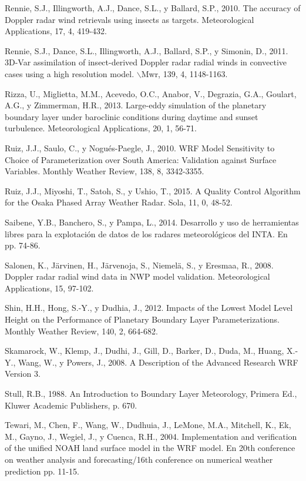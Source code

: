 \documentclass[12pt,spanish,oneside]{book}
\begin{document}
\hypertarget{ref-Rennie2010}{}
Rennie, S.J., Illingworth, A.J., Dance, S.L., y Ballard, S.P., 2010. The
accuracy of Doppler radar wind retrievals using insects as targets.
Meteorological Applications, 17, 4, 419-432.

\hypertarget{ref-Rennie2011}{}
Rennie, S.J., Dance, S.L., Illingworth, A.J., Ballard, S.P., y Simonin,
D., 2011. 3D-Var assimilation of insect-derived Doppler radar radial
winds in convective cases using a high resolution model.
\(\backslash\)Mwr, 139, 4, 1148-1163.

\hypertarget{ref-Rizza2013}{}
Rizza, U., Miglietta, M.M., Acevedo, O.C., Anabor, V., Degrazia, G.A.,
Goulart, A.G., y Zimmerman, H.R., 2013. Large-eddy simulation of the
planetary boundary layer under baroclinic conditions during daytime and
sunset turbulence. Meteorological Applications, 20, 1, 56-71.

\hypertarget{ref-Ruiz2010}{}
Ruiz, J.J., Saulo, C., y Nogués-Paegle, J., 2010. WRF Model Sensitivity
to Choice of Parameterization over South America: Validation against
Surface Variables. Monthly Weather Review, 138, 8, 3342-3355.

\hypertarget{ref-Ruiz2015}{}
Ruiz, J.J., Miyoshi, T., Satoh, S., y Ushio, T., 2015. A Quality Control
Algorithm for the Osaka Phased Array Weather Radar. Sola, 11, 0, 48-52.

\hypertarget{ref-Saibene2014}{}
Saibene, Y.B., Banchero, S., y Pampa, L., 2014. Desarrollo y uso de
herramientas libres para la explotación de datos de los radares
meteorológicos del INTA. En pp. 74-86.

\hypertarget{ref-Salonen2008}{}
Salonen, K., Järvinen, H., Järvenoja, S., Niemelä, S., y Eresmaa, R.,
2008. Doppler radar radial wind data in NWP model validation.
Meteorological Applications, 15, 97-102.

\hypertarget{ref-Shin2012}{}
Shin, H.H., Hong, S.-Y., y Dudhia, J., 2012. Impacts of the Lowest Model
Level Height on the Performance of Planetary Boundary Layer
Parameterizations. Monthly Weather Review, 140, 2, 664-682.

\hypertarget{ref-Skamarock2008}{}
Skamarock, W., Klemp, J., Dudhi, J., Gill, D., Barker, D., Duda, M.,
Huang, X.-Y., Wang, W., y Powers, J., 2008. A Description of the
Advanced Research WRF Version 3.

\hypertarget{ref-Stull1988}{}
Stull, R.B., 1988. An Introduction to Boundary Layer Meteorology,
Primera Ed., Kluwer Academic Publishers, p. 670.

\hypertarget{ref-Tewari2004}{}
Tewari, M., Chen, F., Wang, W., Dudhuia, J., LeMone, M.A., Mitchell, K.,
Ek, M., Gayno, J., Wegiel, J., y Cuenca, R.H., 2004. Implementation and
verification of the unified NOAH land surface model in the WRF model. En
20th conference on weather analysis and forecasting/16th conference on
numerical weather prediction pp. 11-15.
\end{document}

